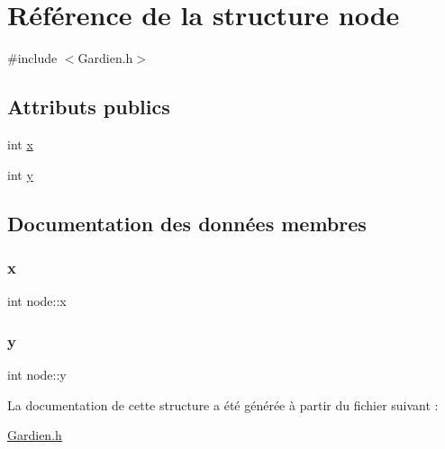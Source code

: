 \hypertarget{structnode}{}\section{Référence de la structure node}
\label{structnode}


{\ttfamily \#include $<$Gardien.\+h$>$}

\subsection*{Attributs publics}
\begin{DoxyCompactItemize}
\item 
int \hyperlink{structnode_a64dd8b65a7d38c632a017d7f36444dbb}{x}
\item 
int \hyperlink{structnode_ae944a3a75efb9856fa5c6f2221e2b49e}{y}
\end{DoxyCompactItemize}


\subsection{Documentation des données membres}
\mbox{\label{structnode_a64dd8b65a7d38c632a017d7f36444dbb}} 
\subsubsection{\texorpdfstring{x}{x}}
{\footnotesize\ttfamily int node\+::x}

\mbox{\label{structnode_ae944a3a75efb9856fa5c6f2221e2b49e}} 
\subsubsection{\texorpdfstring{y}{y}}
{\footnotesize\ttfamily int node\+::y}



La documentation de cette structure a été générée à partir du fichier suivant \+:\begin{DoxyCompactItemize}
\item 
\hyperlink{Gardien_8h}{Gardien.\+h}\end{DoxyCompactItemize}
